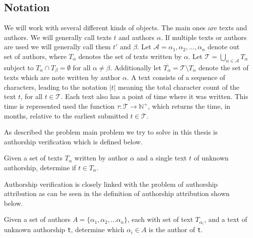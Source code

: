 \subsection{Notation}

We will work with several different kinds of objects. The main ones are texts
and authors. We will generally call texts $t$ and authors $\alpha$. If multiple
texts or authors are used we will generally call them $t'$ and $\beta$. Let
$\mathcal{A} = {\alpha_1, \alpha_2, \dots, \alpha_n}$ denote out set of authors,
where $T_\alpha$ denotes the set of texts written by $\alpha$. Let $\mathcal{T}
= \bigcup_{\alpha \in \mathcal{A}} T_\alpha$ subject to $T_{\alpha} \cap T_\beta
= \emptyset$ for all $\alpha \neq \beta$. Additionally let $\overline{T_\alpha}
= \mathcal{T} \setminus T_\alpha$ denote the set of texts which are note written
by author $\alpha$. A text consists of a sequence of characters, leading to the
notation $|t|$ meaning the total character count of the text $t$, for all $t \in
\mathcal{T}$. Each text also has a point of time where it was written. This
time is represented used the function $\tau \colon \mathcal{T} \rightarrow
\mathbb{N}^+$, which returns the time, in months, relative to the earliest
submitted $t \in \mathcal{T}$.


As described the problem main problem we try to solve in this thesis is
authorship verification which is defined below.

\begin{definition}
    \label{def:authorship_verification}

    Given a set of texts $T_\alpha$ written by author $\alpha$ and a single
    text $t$ of unknown authorship, determine if $t \in T_\alpha$.

\end{definition}

Authorship verification is closely linked with the problem of authorship
attribution as can be seen in the definition of authorship attribution shown
below.

\begin{definition}

    Given a set of authors $A = \{\alpha_1, \alpha_2,...\alpha_n\}$, each with
    set of text $T_{\alpha_i}$, and a text of unknown authorship \texttt{t},
    determine which $\alpha_i \in A$ is the author of \texttt{t}.

\end{definition}


